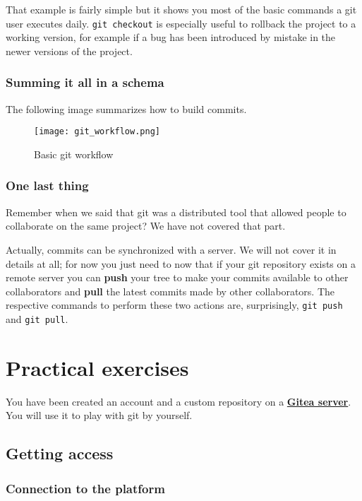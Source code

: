 \documentclass[12pt]{article}
\let\oldhref\href
\renewcommand{\href}[2]{\oldhref{#1}{\bfseries#2}}
\begin{document}
That example is fairly simple but it shows you most of the basic commands a git user executes daily. \texttt{git checkout} is especially useful to rollback the project to a working version, for example if a bug has been introduced by mistake in the newer versions of the project.

\subsubsection{Summing it all in a schema}

The following image summarizes how to build commits.

\begin{figure}[!h]\centering\captionsetup{}
   \texttt{[image: git\_workflow.png]}
   \caption{Basic git workflow}
\end{figure}

\subsubsection{One last thing}

Remember when we said that git was a distributed tool that allowed people to collaborate on the same project? We have not covered that part.

Actually, commits can be synchronized with a server. We will not cover it in details at all; for now you just need to now that if your git repository exists on a remote server you can \textbf{push} your tree to make your commits available to other collaborators and \textbf{pull} the latest commits made by other collaborators. The respective commands to perform these two actions are, surprisingly, \texttt{git push} and \texttt{git pull}.

\section{Practical exercises}

You have been created an account and a custom repository on a \href{https://gitea.electrosenpai.dev}{Gitea server}. You will use it to play with git by yourself.

\subsection{Getting access}

\subsubsection{Connection to the platform}
\end{document}
